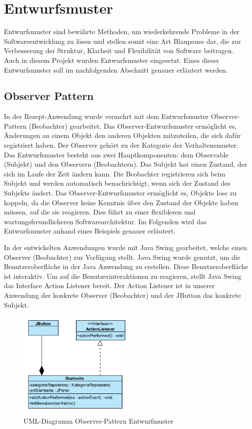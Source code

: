 \chapter{Entwurfsmuster}
Entwurfsmuster sind bewährte Methoden, um wiederkehrende Probleme in der Softwareentwicklung zu lösen und stellen somit eine Art Blaupause dar, die zur Verbesserung der Struktur, Klarheit und Flexibilität von Software beitragen. Auch in diesem Projekt wurden Entwurfsmuster eingesetzt. Eines dieser Entwurfsmuster soll im nachfolgenden Abschnitt genauer erläutert werden.

\section{Observer Pattern}
In der Rezept-Anwendung wurde vermehrt mit dem Entwurfsmuster Observer-Pattern (Beobachter) gearbeitet. Das Observer-Entwurfsmuster ermöglicht es, Änderungen an einem Objekt den anderen Objekten mitzuteilen, die sich dafür registriert haben. Der Observer gehört zu der Kategorie der Verhaltensmuster. Das Entwurfsmuster besteht aus zwei Hauptkomponenten: dem Observable (Subjekt) und den Observern (Beobachtern). 
Das Subjekt hat einen Zustand, der sich im Laufe der Zeit ändern kann. Die Beobachter registrieren sich beim Subjekt und werden automatisch benachrichtigt, wenn sich der Zustand des Subjekts ändert. Das Observer-Entwurfsmuster ermöglicht es, Objekte lose zu koppeln, da die Observer keine Kenntnis über den Zustand der Objekte haben müssen, auf die sie reagieren. Dies führt zu einer flexibleren und wartungsfreundlicheren Softwarearchitektur.
Im Folgenden wird das Entwurfsmuster anhand eines Beispiels genauer erläutert. 

In der entwickelten Anwendungen wurde mit Java Swing gearbeitet, welche einen Observer (Beobachter) zur Verfügung stellt. Java Swing wurde genutzt, um die Benutzeroberfläche in der Java Anwendung zu erstellen. Diese Benutzeroberfläche ist interaktiv. Um auf die Benutzerinteraktionen zu reagieren, stellt Java Swing das Interface Action Listener bereit. Der Action Listener ist in unserer Anwendung der konkrete Observer (Beobachter) und der JButton das konkrete Subjekt. 
\begin{figure}[ht]
	\centering
	\includegraphics[width=0.50\textwidth]{Bilder/Entwurfsmuster-UML.png} 
	\caption{UML-Diagramm Observer-Pattern Entwurfmuster}
	\label{fig:EntwurfmusterUML}
\end{figure}

